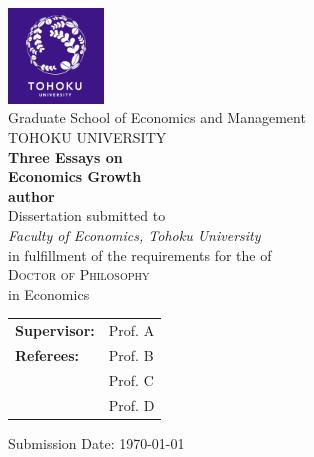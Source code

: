 \documentclass{book}
\author{Your Name}
\theoremstyle{definition}\newtheorem{definition}{Definition}
\theoremstyle{definition}\newtheorem{remark}{Remark}
\theoremstyle{definition}\newtheorem{prop}{Proposition}
\theoremstyle{definition}\newtheorem{fact}{Fact}
\begin{document}
\begin{titlepage}
	\begin{center}
		\includegraphics[width=0.19\textwidth]{logo.png}\\[5pt]
		{Graduate School of Economics and Management}\\[5pt]
		{TOHOKU UNIVERSITY}\\[5pt]
		
		\vspace{1.5cm}
		{\huge\bfseries Three Essays on \\ Economics Growth\\}
		\vspace{1.5cm}
		{\Large\bfseries author}\\[5pt]
		
		\vspace{2cm}
		{Dissertation  submitted to} \\[5pt]
		\emph{{Faculty of Economics, Tohoku University}}\\[5pt]
		{in fulfillment of the requirements for the of} \\[5pt]
		\textsc{\Large{{Doctor of Philosophy}}} \\[5pt]
		{in Economics} \vspace{0.4cm} \\[2cm]
		\vfill
		
		\begin{tabular}{l l} 
			\textbf{Supervisor:} & Prof. A \\ 
			\textbf{Referees:} & Prof. B \\
			& Prof. C \\
			& Prof. D
		\end{tabular} 
		
		\vfill
		Submission Date: \today
	\end{center}
\end{titlepage}

\newpage 
\end{document}
